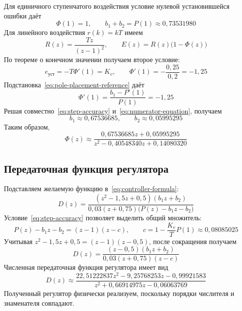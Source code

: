 Для единичного ступенчатого воздействия условие нулевой
установившейся ошибки даёт
\begin{equation}
  \Phi(1)=1,
  \qquad b_1+b_2=P(1)\approx0{,}73531980
  \label{eq:step-accuracy}
\end{equation}
Для линейного воздействия $r(k)=kT$ имеем
\begin{equation}
  R(z)=\frac{Tz}{(z-1)^2},
  \qquad E(z)=R(z)\bigl(1-\Phi(z)\bigr)
  \label{eq:ramp-error}
\end{equation}
По теореме о конечном значении получаем второе условие:
\begin{equation}
  e_{\text{уст}}=-T\Phi'(1)=K_v,
  \qquad \Phi'(1)=-\frac{0{,}25}{0{,}2}=-1{,}25
  \label{eq:ramp-accuracy}
\end{equation}
Подстановка~\eqref{eq:pole-placement-reference} даёт
\begin{equation}
  \Phi'(1)
    =\frac{b_1-P'(1)}{P(1)}=-1{,}25
  \label{eq:numerator-equation}
\end{equation}
Решая совместно~\eqref{eq:step-accuracy} и~\eqref{eq:numerator-equation},
получаем
\begin{equation}
  b_1\approx0{,}67536685,
  \qquad b_2\approx0{,}05995295
  \label{eq:numerator-coefficients}
\end{equation}
Таким образом,
\begin{equation}
  \Phi(z)\approx
  \frac{0{,}67536685z+0{,}05995295}
       {z^2-0{,}40548340z+0{,}14080320}
  \label{eq:pole-placement-reference-numeric}
\end{equation}

\subsection{Передаточная функция регулятора}

Подставляем желаемую функцию в~\eqref{eq:controller-formula}:
\begin{equation}
  D(z)=\frac{(z^2-1{,}5z+0{,}5)(b_1z+b_2)}
  {0{,}03(z+0{,}75)\bigl(P(z)-b_1z-b_2\bigr)}
  \label{eq:pole-placement-controller}
\end{equation}
Условие~\eqref{eq:step-accuracy} позволяет выделить общий множитель:
\begin{equation}
  P(z)-b_1z-b_2=(z-1)(z-c),
  \qquad c=1-\frac{K_v}{T}P(1)\approx0{,}08085025
  \label{eq:controller-factorization}
\end{equation}
Учитывая $z^2-1{,}5z+0{,}5=(z-1)(z-0{,}5)$,
после сокращения получаем
\begin{equation}
  D(z)=\frac{(z-0{,}5)(b_1z+b_2)}
             {0{,}03(z+0{,}75)(z-c)}
  \label{eq:pole-placement-controller-reduced}
\end{equation}
Численная передаточная функция регулятора имеет вид
\begin{equation}
  D(z)\approx
  \frac{22{,}51222837z^2-9{,}25768253z-0{,}99921583}
       {z^2+0{,}66914975z-0{,}06063769}
  \label{eq:pole-placement-controller-numeric}
\end{equation}
Полученный регулятор физически реализуем, поскольку порядки
числителя и знаменателя совпадают.

